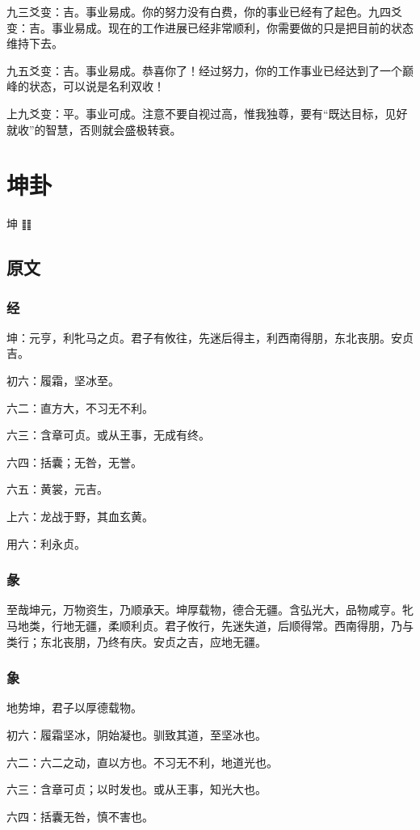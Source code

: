 \documentclass[12pt,oneside]{book}
\begin{document}
九三爻变：吉。事业易成。你的努力没有白费，你的事业已经有了起色。九四爻变：吉。事业易成。现在的工作进展已经非常顺利，你需要做的只是把目前的状态维持下去。

九五爻变：吉。事业易成。恭喜你了！经过努力，你的工作事业已经达到了一个巅峰的状态，可以说是名利双收！

上九爻变：平。事业可成。注意不要自视过高，惟我独尊，要有“既达目标，见好就收”的智慧，否则就会盛极转衰。


\chapter{坤卦}
坤 {\Large ䷁}

\section{原文}
\subsection{经}
坤：元亨，利牝马之贞。君子有攸往，先迷后得主，利西南得朋，东北丧朋。安贞吉。

初六：履霜，坚冰至。

六二：直方大，不习无不利。

六三：含章可贞。或从王事，无成有终。

六四：括囊；无咎，无誉。

六五：黄裳，元吉。

上六：龙战于野，其血玄黄。

用六：利永贞。

\subsection{彖}
至哉坤元，万物资生，乃顺承天。坤厚载物，德合无疆。含弘光大，品物咸亨。牝马地类，行地无疆，柔顺利贞。君子攸行，先迷失道，后顺得常。西南得朋，乃与类行；东北丧朋，乃终有庆。安贞之吉，应地无疆。

\subsection{象}
地势坤，君子以厚德载物。

初六：履霜坚冰，阴始凝也。驯致其道，至坚冰也。

六二：六二之动，直以方也。不习无不利，地道光也。

六三：含章可贞；以时发也。或从王事，知光大也。

六四：括囊无咎，慎不害也。
\end{document}
